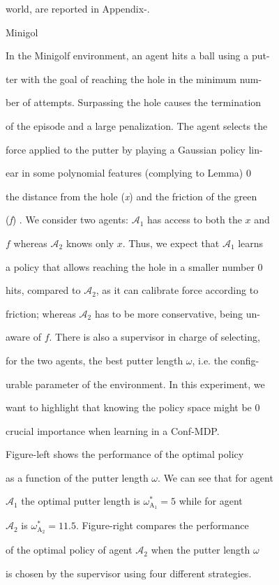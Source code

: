 \documentclass[a4paper,12pt]{article}
\begin{document}
world, are reported in Appendix-.

Minigol

In the Minigolf environment, an agent hits a ball using a put-

ter with the goal of reaching the hole in the minimum num-

ber of attempts. Surpassing the hole causes the termination

of the episode and a large penalization. The agent selects the

force applied to the putter by playing a Gaussian policy lin-

ear in some polynomial features (complying to Lemma) $0$

the distance from the hole ({\it x}) and the friction of the green

({\it f}) . We consider two agents: $\mathcal{A}_{1}$ has access to both the $x$ and

$f$ whereas $\mathcal{A}_{2}$ knows only $x$. Thus, we expect that $\mathcal{A}_{1}$ learns

a policy that allows reaching the hole in a smaller number $0$

hits, compared to $\mathcal{A}_{2}$, as it can calibrate force according to

friction; whereas $\mathcal{A}_{2}$ has to be more conservative, being un-

aware of $f$. There is also a supervisor in charge of selecting,

for the two agents, the best putter length $\omega$, i.e. the config-

urable parameter of the environment. In this experiment, we

want to highlight that knowing the policy space might be $0$

crucial importance when learning in a Conf-MDP.

Figure-left shows the performance of the optimal policy

as a function of the putter length $\omega$. We can see that for agent

$\mathcal{A}_{1}$ the optimal putter length is $\omega_{\mathrm{A}_{1}}^{*} = 5$ while for agent

$\mathcal{A}_{2}$ is $\omega_{\mathrm{A}_{2}}^{*} = 11.5$. Figure-right compares the performance

of the optimal policy of agent $\mathcal{A}_{2}$ when the putter length $\omega$

is chosen by the supervisor using four different strategies.
\end{document}
